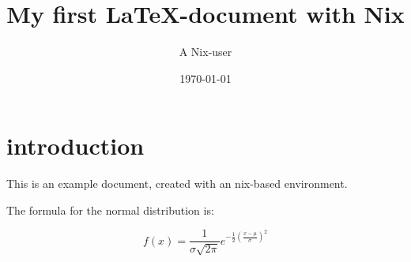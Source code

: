 \documentclass[a4paper,12pt]{scrartcl}
\title{My first \LaTeX-document with Nix}
\author{A Nix-user}
\date{\today}
\begin{document}
\maketitle

\section{introduction}

This is an example document, created with an nix-based environment.

The formula for the normal distribution is:

\[
  f(x) = \frac{1}{\sigma\sqrt{2\pi}}
         e^{-\frac{1}{2}\left(\frac{x-\mu}{\sigma}\right)^2}
\]
\end{document}
